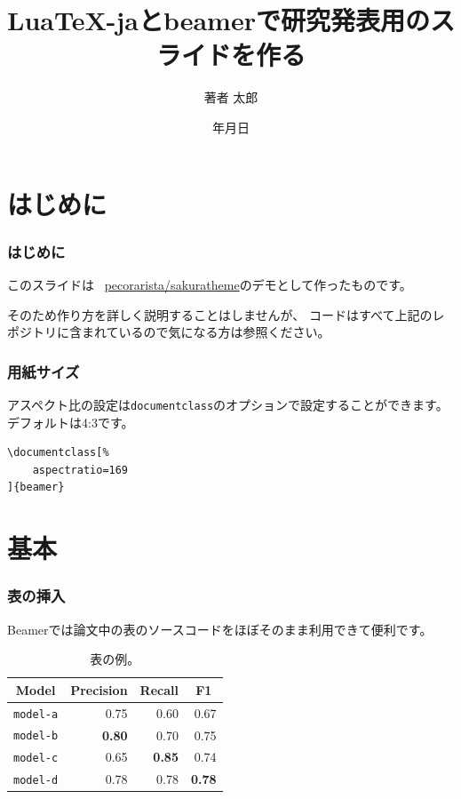 \documentclass[%
    hyperref={%
        colorlinks,
        linkcolor=sDarkBlue,
        urlcolor=sDarkBlue,
        citecolor=sDarkBlue
    },
    aspectratio=169
]{beamer}
\title{Lua\TeX{}-jaとbeamerで研究発表用のスライドを作る}
\institute{所属}
\author{著者 太郎}
\date{{\number\year}年{\number\month}月{\number\day}日}
\newcommand\header[1]{\multicolumn{1}{c}{\textbf{#1}}}
\begin{document}
    \maketitle

    \section{はじめに}
    \begin{frame}
        \frametitle{はじめに}
        このスライドは \faGithub\ \href{https://github.com/pecorarista/sakuratheme}{\ttfamily pecorarista/sakuratheme}のデモとして作ったものです。

        \bigskip

        そのため作り方を詳しく説明することはしませんが、
        コードはすべて上記のレポジトリに含まれているので気になる方は参照ください。
    \end{frame}

    \begin{frame}[fragile]
        \frametitle{用紙サイズ}
        アスペクト比の設定は\texttt{documentclass}のオプションで設定することができます。
        デフォルトは4:3です。
        \begin{leftbar}
\begin{lstlisting}
\documentclass[%
    aspectratio=169
]{beamer}
\end{lstlisting}
        \end{leftbar}
    \end{frame}

    \section{基本}
    \begin{frame}
        \frametitle{表の挿入}
        Beamerでは論文中の表のソースコードをほぼそのまま利用できて便利です。
        \begin{table}
            \centering
            \caption{表の例。}
            \begin{tabular}{lrrr}
                \toprule
                \header{Model}   & \header{Precision} & \header{Recall} & \header{F1} \\
                \midrule
                \texttt{model-a} & 0.75 & 0.60 & 0.67 \\
                \texttt{model-b} & \textbf{0.80} & 0.70 & 0.75 \\
                \texttt{model-c} & 0.65 & \textbf{0.85} & 0.74 \\
                \texttt{model-d} & 0.78 & 0.78 & \textbf{0.78} \\
                \bottomrule
            \end{tabular}
        \end{table}
    \end{frame}
\end{document}
